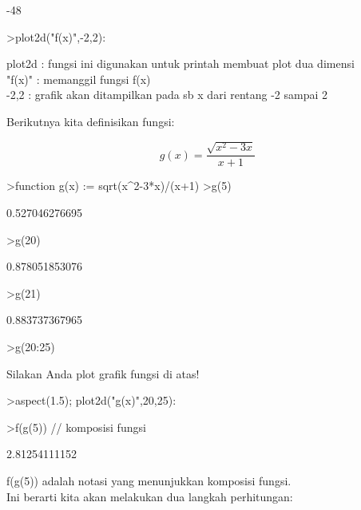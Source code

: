 \documentclass[a4paper,10pt]{article}
\begin{document}
\begin{eulernotebook}
\begin{eulercomment}
\begin{eulercomment}
\begin{euleroutput}
  -48
\end{euleroutput}
\begin{eulerprompt}
>plot2d("f(x)",-2,2):
\end{eulerprompt}
\begin{eulercomment}
plot2d : fungsi ini digunakan untuk printah membuat plot dua dimensi\\
"f(x)" : memanggil fungsi f(x)\\
-2,2   : grafik akan ditampilkan pada sb x dari rentang -2 sampai 2




Berikutnya kita definisikan fungsi:

\end{eulercomment}
\begin{eulerformula}
\[
g(x)=\frac{\sqrt{x^2-3x}}{x+1}
\]
\end{eulerformula}
\begin{eulerprompt}
>function g(x) := sqrt(x^2-3*x)/(x+1)
>g(5)
\end{eulerprompt}
\begin{euleroutput}
  0.527046276695
\end{euleroutput}
\begin{eulerprompt}
>g(20)
\end{eulerprompt}
\begin{euleroutput}
  0.878051853076
\end{euleroutput}
\begin{eulerprompt}
>g(21)
\end{eulerprompt}
\begin{euleroutput}
  0.883737367965
\end{euleroutput}
\begin{eulerprompt}
>g(20:25)
\end{eulerprompt}
\begin{euleroutput}
  [0.878052,  0.883737,  0.888915,  0.89365,  0.897998,  0.902003]
\end{euleroutput}
\begin{eulercomment}
Silakan Anda plot grafik fungsi di atas!
\end{eulercomment}
\begin{eulerprompt}
>aspect(1.5); plot2d("g(x)",20,25):
\end{eulerprompt}
\begin{eulerprompt}
>f(g(5)) // komposisi fungsi
\end{eulerprompt}
\begin{euleroutput}
  2.81254111152
\end{euleroutput}
\begin{eulercomment}
f(g(5)) adalah notasi yang menunjukkan komposisi fungsi.\\
Ini berarti kita akan melakukan dua langkah perhitungan:


\end{eulercomment}
\end{eulercomment}
\end{eulercomment}
\end{eulernotebook}
\end{document}
